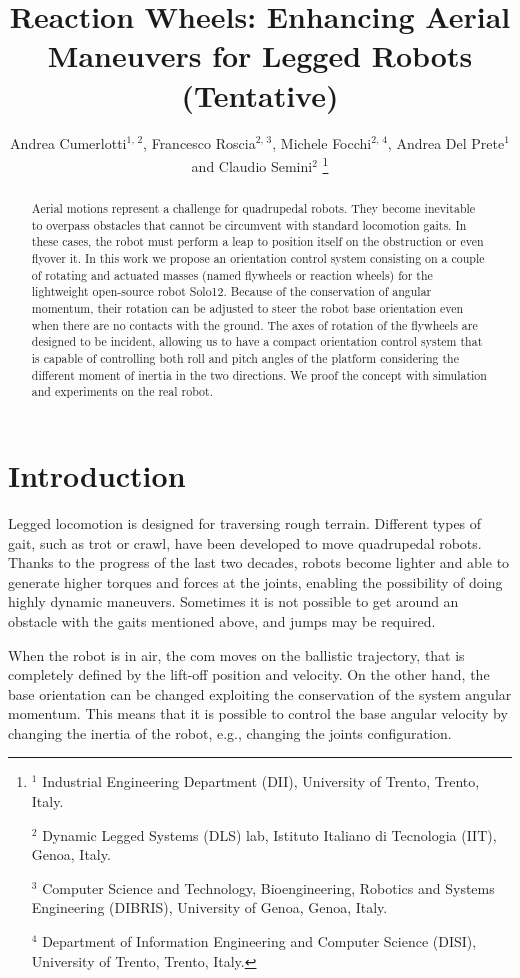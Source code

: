 \documentclass[journal,letterpaper]{IEEEtran}
\title{Reaction Wheels: Enhancing Aerial Maneuvers for
	Legged Robots (Tentative)}
\author{Andrea Cumerlotti$^{1, \, 2}$, Francesco Roscia$^{2, \, 3}$, Michele Focchi$^{2, \, 4}$, Andrea Del Prete$^{1}$ and Claudio Semini$^2$
	\thanks{$^1$ Industrial Engineering Department (DII), University of Trento, Trento, Italy.
		
	$^2$ Dynamic Legged Systems (DLS) lab, Istituto Italiano di Tecnologia (IIT), Genoa, Italy.
	
	$^3$ Computer Science and Technology, Bioengineering, Robotics and Systems Engineering (DIBRIS), University of Genoa, Genoa, Italy.
	
	$^4$ Department of Information Engineering and Computer Science (DISI), University of Trento, Trento, Italy.

}}
\begin{document}
\maketitle
\thispagestyle{empty}
\pagestyle{empty}

\begin{abstract}%
Aerial motions represent a challenge for quadrupedal robots. They become inevitable to overpass obstacles that cannot be circumvent with standard locomotion gaits. In these cases, the robot must perform a leap to position itself on the obstruction or even flyover it. In this work we propose an orientation control system consisting on a couple of rotating and actuated masses (named flywheels or reaction wheels) for the lightweight open-source robot Solo12. Because of the conservation of angular momentum, their rotation can be adjusted to steer the robot base orientation even when there are no contacts with the ground. The axes of rotation of the flywheels are designed to be incident, allowing us to have a compact orientation control system that is capable of controlling both roll and pitch angles of the platform considering the different moment of inertia in the two directions. We proof the concept with simulation and experiments on the real robot.
\end{abstract}

\begin{IEEEkeywords}
	 
\end{IEEEkeywords}

\section{Introduction}\label{sec:introduction}
Legged locomotion is designed for traversing rough terrain.
Different types of gait, such as trot or crawl, have been developed to move quadrupedal robots. 
Thanks to the progress of the last two decades, robots become lighter and able to generate higher torques and forces at the joints, enabling the possibility of doing highly dynamic maneuvers.
Sometimes it is not possible to get around an obstacle with the gaits mentioned above, and jumps may be required. 

When the robot is in air, the \acrfull{com} moves on the ballistic trajectory, that is completely defined by the lift-off position and velocity. On the other hand, the base orientation can be changed exploiting the conservation of the system angular momentum. This means that it is possible to control the base angular velocity by changing the inertia of the robot, e.g., changing the joints configuration. 
\end{document}

